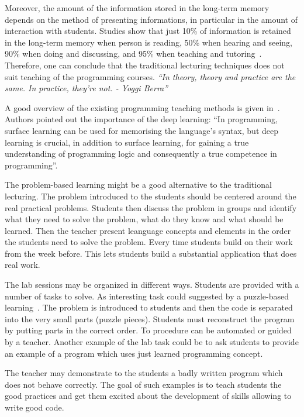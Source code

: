 \documentclass{article}
\begin{document}
Moreover, the amount of the information stored in the long-term memory depends
on the method of presenting informations, in particular in the amount of
interaction with students.  Studies show that just 10\% of information  is
retained in the long-term memory when person is reading, 50\% when hearing and
seeing, 90\% when doing and discussing, and 95\% when teaching and
tutoring~\cite{magnesen}. Therefore, one can conclude that the traditional
lecturing techniques does not suit teaching of the programming courses.
\emph{``In theory, theory and practice are the same. In practice,
they’re not. - Yoggi Berra'' }



A good overview of the existing programming teaching methods is given
in~\cite{mohorovivcic2011overview}. Authors pointed out the importance
of the deep learning: ``In programming, surface learning can be used
for memorising the language’s syntax, but deep learning is crucial, in
addition to surface learning, for gaining a true understanding of
programming logic and consequently a true competence in
programming''.

The problem-based learning might be a good alternative to the
traditional lecturing.  The problem introduced to the students should
be centered around the real practical problems. Students then discuss
the problem in groups and identify what they need to solve the
problem, what do they know and what should be learned. Then the
teacher present leanguage concepts and elements in the order the
students need to solve the problem. Every time students build
on their work from the week before. This lets students build a
substantial application that does real work.


The lab sessions may be organized in different ways. Students are
provided with a number of tasks to solve. As interesting task could
suggested by a puzzle-based
learning~\cite{mohorovivcic2011overview}. The problem is introduced to
students and then the code is separated into the very small parts
(puzzle pieces). Students must reconstruct the program by putting
parts in the correct order. To procedure can be automated or guided by
a teacher. Another example of the lab task could be to ask students to
provide an example of a program which uses just learned programming
concept.


The teacher may demonstrate to the students a badly written program which does
not behave correctly. The goal of such examples is to teach students
the good practices and get them excited about the development
of skills allowing to write good code.
\end{document}
